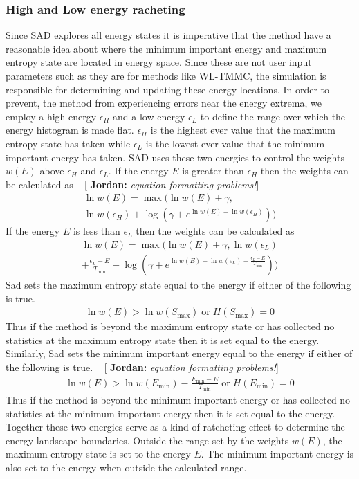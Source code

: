 \documentclass[letterpaper,twocolumn,amsmath,amssymb,pre,aps,10pt]{revtex4-1}
\newcommand{\blue}[1]{{\bf \color{blue} #1}}
\newcommand{\jpsays}[1]{{\color{red} [\blue{Jordan:} \emph{#1}]}}
\begin{document}
\subsubsection{High and Low energy racheting}
Since SAD explores all energy states it is imperative that the method
have a reasonable idea about where the minimum important energy and
maximum entropy state are located in energy space. Since these are not
user input parameters such as they are for methods like WL-TMMC, the
simulation is responsible for determining and updating these energy
locations. In order to prevent, the method from experiencing errors
near the energy extrema, we employ a high energy $\epsilon_H$ and a low
energy $\epsilon_L$ to define the range over which the energy histogram
is made flat. $\epsilon_H$ is the highest ever value that the maximum
entropy state has taken while $\epsilon_L$ is the lowest ever value
that the minimum important energy has taken. SAD uses these two
energies to control the weights $w(E)$ above $\epsilon_H$ and
$\epsilon_L$. If the energy $E$ is greater than $\epsilon_H$ then the
weights can be calculated as ~\jpsays{equation formatting problems!}
\begin{equation}
\begin{aligned}
\ln w(E) = \max(\ln w(E) + \gamma, \\
    \ln w(\epsilon_H) + \log(\gamma + e^{\ln w(E)-\ln w(\epsilon_H)}))
\end{aligned}
\end{equation}
If the energy $E$ is less than $\epsilon_L$ then the weights can be
calculated as
\begin{equation}
\begin{aligned}
\ln w(E) = \max(\ln w(E) + \gamma, \ln w(\epsilon_L) \\
    + \frac{\epsilon_L - E}{T_\text{min}}
    + \log(\gamma + e^{\ln w(E) -\ln w(\epsilon_L)
    + \frac{\epsilon_L -E}{T_\text{min}}}))
\end{aligned}
\end{equation}
Sad sets the maximum entropy state equal to the energy if either of the
following is true.
\begin{align}
\ln w(E) > \ln w(S_\text{max}) \; \text{or} \; H(S_\text{max}) = 0
\end{align}
Thus if the method is beyond the maximum entropy state or has collected no
statistics at the maximum entropy state then it is set equal to the energy.
Similarly, Sad sets the minimum important energy equal to the energy if
either of the following is true.
~\jpsays{equation formatting problems!}
\begin{align}
\ln w(E) > \ln w(E_\text{min}) - \frac{E_\text{min}-E}{T_\text{min}}
\; \text{or} \; H(E_\text{min}) = 0
\end{align}
Thus if the method is beyond the minimum important energy or has collected no
statistics at the minimum important energy then it is set equal to the energy.
Together these two energies serve as a kind of ratcheting effect to
determine the energy landscape boundaries. Outside the range set by the
weights $w(E)$, the maximum entropy state is set to the energy $E$. The
minimum important energy is also set to the energy when outside the
calculated range.
\end{document}
